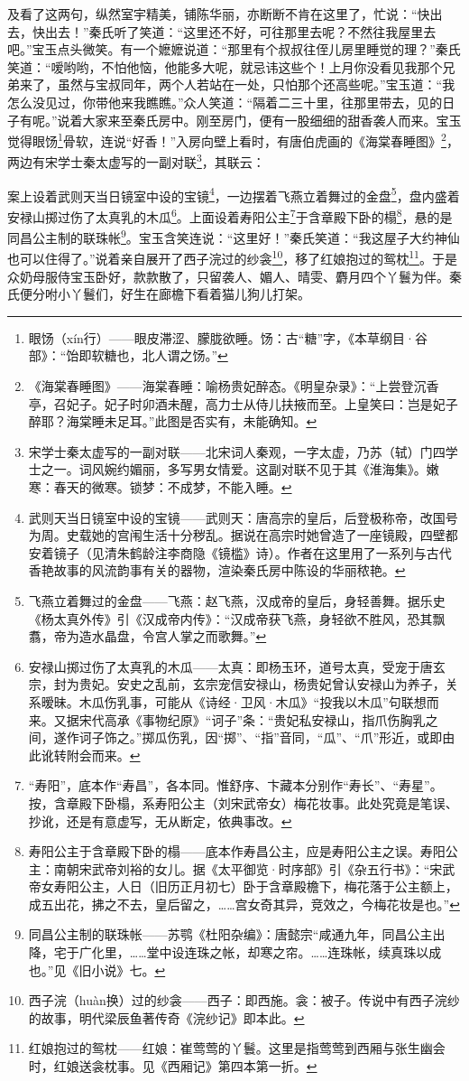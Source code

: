 \par 及看了这两句，纵然室宇精美，铺陈华丽，亦断断不肯在这里了，忙说：“快出去，快出去！”秦氏听了笑道：“这里还不好，可往那里去呢？不然往我屋里去吧。”宝玉点头微笑。有一个嬷嬷说道：“那里有个叔叔往侄儿房里睡觉的理？”秦氏笑道：“嗳哟哟，不怕他恼，他能多大呢，就忌讳这些个！上月你没看见我那个兄弟来了，虽然与宝叔同年，两个人若站在一处，只怕那个还高些呢。”宝玉道：“我怎么没见过，你带他来我瞧瞧。”众人笑道：“隔着二三十里，往那里带去，见的日子有呢。”说着大家来至秦氏房中。刚至房门，便有一股细细的甜香袭人而来。宝玉觉得眼饧\footnote{眼饧（xín行）——眼皮滞涩、朦胧欲睡。饧：古“糖”字，《本草纲目·谷部》：“饴即软糖也，北人谓之饧。”}骨软，连说“好香！”入房向壁上看时，有唐伯虎画的《海棠春睡图》\footnote{《海棠春睡图》——海棠春睡：喻杨贵妃醉态。《明皇杂录》：“上尝登沉香亭，召妃子。妃子时卯酒未醒，高力士从侍儿扶掖而至。上皇笑曰：岂是妃子醉耶？海棠睡未足耳。”此图是否实有，未能确知。}，两边有宋学士秦太虚写的一副对联\footnote{宋学士秦太虚写的一副对联——北宋词人秦观，一字太虚，乃苏（轼）门四学士之一。词风婉约媚丽，多写男女情爱。这副对联不见于其《淮海集》。嫩寒：春天的微寒。锁梦：不成梦，不能入睡。}，其联云：
\par 案上设着武则天当日镜室中设的宝镜\footnote{武则天当日镜室中设的宝镜——武则天：唐高宗的皇后，后登极称帝，改国号为周。史载她的宫闱生活十分秽乱。据说在高宗时她曾造了一座镜殿，四壁都安着镜子（见清朱鹤龄注李商隐《镜槛》诗）。作者在这里用了一系列与古代香艳故事的风流韵事有关的器物，渲染秦氏房中陈设的华丽秾艳。}，一边摆着飞燕立着舞过的金盘\footnote{飞燕立着舞过的金盘——飞燕：赵飞燕，汉成帝的皇后，身轻善舞。据乐史《杨太真外传》引《汉成帝内传》：“汉成帝获飞燕，身轻欲不胜风，恐其飘翥，帝为造水晶盘，令宫人掌之而歌舞。”}，盘内盛着安禄山掷过伤了太真乳的木瓜\footnote{安禄山掷过伤了太真乳的木瓜——太真：即杨玉环，道号太真，受宠于唐玄宗，封为贵妃。安史之乱前，玄宗宠信安禄山，杨贵妃曾认安禄山为养子，关系暧昧。木瓜伤乳事，可能从《诗经·卫风·木瓜》“投我以木瓜”句联想而来。又据宋代高承《事物纪原》“诃子”条：“贵妃私安禄山，指爪伤胸乳之间，遂作诃子饰之。”掷瓜伤乳，因“掷”、“指”音同，“瓜”、“爪”形近，或即由此讹转附会而来。}。上面设着寿阳公主\footnote{“寿阳”，底本作“寿昌”，各本同。惟舒序、卞藏本分别作“寿长”、“寿星”。按，含章殿下卧榻，系寿阳公主（刘宋武帝女）梅花妆事。此处究竟是笔误、抄讹，还是有意虚写，无从断定，依典事改。}于含章殿下卧的榻\footnote{寿阳公主于含章殿下卧的榻——底本作寿昌公主，应是寿阳公主之误。寿阳公主：南朝宋武帝刘裕的女儿。据《太平御览·时序部》引《杂五行书》：“宋武帝女寿阳公主，人日（旧历正月初七）卧于含章殿檐下，梅花落于公主额上，成五出花，拂之不去，皇后留之，……宫女奇其异，竞效之，今梅花妆是也。”}，悬的是同昌公主制的联珠帐\footnote{同昌公主制的联珠帐——苏鹗《杜阳杂编》：唐懿宗“咸通九年，同昌公主出降，宅于广化里，……堂中设连珠之帐，却寒之帘。……连珠帐，续真珠以成也。”见《旧小说》七。}。宝玉含笑连说：“这里好！”秦氏笑道：“我这屋子大约神仙也可以住得了。”说着亲自展开了西子浣过的纱衾\footnote{西子浣（huàn换）过的纱衾——西子：即西施。衾：被子。传说中有西子浣纱的故事，明代梁辰鱼著传奇《浣纱记》即本此。}，移了红娘抱过的鸳枕\footnote{红娘抱过的鸳枕——红娘：崔莺莺的丫鬟。这里是指莺莺到西厢与张生幽会时，红娘送衾枕事。见《西厢记》第四本第一折。}。于是众奶母服侍宝玉卧好，款款散了，只留袭人、媚人、晴雯、麝月四个丫鬟为伴。秦氏便分咐小丫鬟们，好生在廊檐下看着猫儿狗儿打架。
